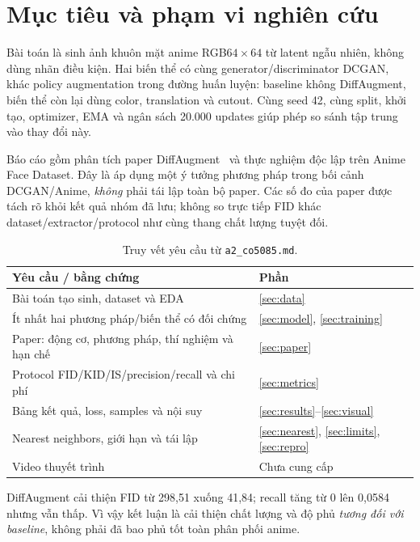 \documentclass[11pt,a4paper]{article}
\begin{document}

\section{Mục tiêu và phạm vi nghiên cứu}\label{sec:scope}
Bài toán là sinh ảnh khuôn mặt anime RGB$64\times 64$ từ latent ngẫu nhiên, không dùng nhãn điều kiện. Hai biến thể có cùng generator/discriminator DCGAN, khác policy augmentation trong đường huấn luyện: baseline không DiffAugment, biến thể còn lại dùng color, translation và cutout. Cùng seed 42, cùng split, khởi tạo, optimizer, EMA và ngân sách 20.000 updates giúp phép so sánh tập trung vào thay đổi này.

Báo cáo gồm phân tích paper DiffAugment~\cite{diffaugment} và thực nghiệm độc lập trên Anime Face Dataset. Đây là áp dụng một ý tưởng phương pháp trong bối cảnh DCGAN/Anime, \emph{không} phải tái lập toàn bộ paper. Các số đo của paper được tách rõ khỏi kết quả nhóm đã lưu; không so trực tiếp FID khác dataset/extractor/protocol như cùng thang chất lượng tuyệt đối.

\begin{table}[htbp]\centering\small\caption{Truy vết yêu cầu từ \texttt{a2\_co5085.md}.}
\begin{tabularx}{\linewidth}{Xl}\toprule Yêu cầu / bằng chứng & Phần\\\midrule
Bài toán tạo sinh, dataset và EDA & \ref{sec:data}\\
Ít nhất hai phương pháp/biến thể có đối chứng & \ref{sec:model}, \ref{sec:training}\\
Paper: động cơ, phương pháp, thí nghiệm và hạn chế & \ref{sec:paper}\\
Protocol FID/KID/IS/precision/recall và chi phí & \ref{sec:metrics}\\
Bảng kết quả, loss, samples và nội suy & \ref{sec:results}--\ref{sec:visual}\\
Nearest neighbors, giới hạn và tái lập & \ref{sec:nearest}, \ref{sec:limits}, \ref{sec:repro}\\
Video thuyết trình & Chưa cung cấp\\\bottomrule\end{tabularx}\end{table}

DiffAugment cải thiện FID từ 298,51 xuống 41,84; recall tăng từ 0 lên 0,0584 nhưng vẫn thấp. Vì vậy kết luận là cải thiện chất lượng và độ phủ \emph{tương đối với baseline}, không phải đã bao phủ tốt toàn phân phối anime.
\disclosure
\clearpage
\end{document}
